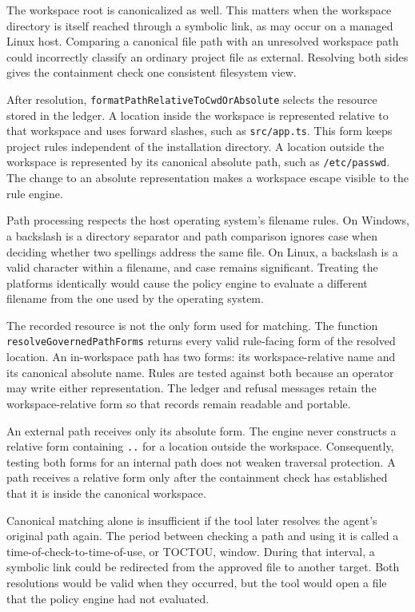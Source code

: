 The workspace root is canonicalized as well. This matters when the workspace
directory is itself reached through a symbolic link, as may occur on a managed
Linux host. Comparing a canonical file path with an unresolved workspace path
could incorrectly classify an ordinary project file as external. Resolving both
sides gives the containment check one consistent filesystem view.

After resolution, \texttt{formatPathRelativeToCwdOrAbsolute} selects the
resource stored in the ledger. A location inside the workspace is represented
relative to that workspace and uses forward slashes, such as
\texttt{src/app.ts}. This form keeps project rules independent of the
installation directory. A location outside the workspace is represented by
its canonical absolute path, such as \texttt{/etc/passwd}. The change to an
absolute representation makes a workspace escape visible to the rule engine.

Path processing respects the host operating system's filename rules. On
Windows, a backslash is a directory separator and path comparison ignores case
when deciding whether two spellings address the same file. On Linux, a
backslash is a valid character within a filename, and case remains significant.
Treating the platforms identically would cause the policy engine to evaluate a
different filename from the one used by the operating system.

The recorded resource is not the only form used for matching. The function
\texttt{resolveGovernedPathForms} returns every valid rule-facing form of the
resolved location. An in-workspace path has two forms: its workspace-relative
name and its canonical absolute name. Rules are tested against both because an
operator may write either representation. The ledger and refusal messages
retain the workspace-relative form so that records remain readable and
portable.

An external path receives only its absolute form. The engine never constructs
a relative form containing \texttt{..} for a location outside the workspace.
Consequently, testing both forms for an internal path does not weaken traversal
protection. A path receives a relative form only after the containment check
has established that it is inside the canonical workspace.

Canonical matching alone is insufficient if the tool later resolves the
agent's original path again. The period between checking a path and using it is
called a time-of-check-to-time-of-use, or TOCTOU, window. During that interval,
a symbolic link could be redirected from the approved file to another target.
Both resolutions would be valid when they occurred, but the tool would open a
file that the policy engine had not evaluated.

